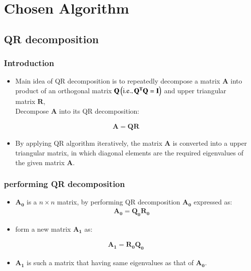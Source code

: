 \documentclass[journal]{IEEEtran}
\begin{document}
\section{Chosen Algorithm}
\subsection{QR decomposition\\}
\subsubsection{Introduction\\}
\begin{itemize}
    \item Main idea of QR decomposition is to repeatedly decompose a matrix $\mathbf{A}$ into product of an orthogonal matrix $\mathbf{Q} \left(\text{i.e}.,\mathbf{Q^{T}Q=I}\right)$ and upper triangular matrix $\mathbf{R}$, \\
    
    Decompose $\mathbf{A}$ into its QR decomposition:
\end{itemize}
\begin{align*}
    \mathbf{A=QR}
\end{align*}
\begin{itemize}
    \item By applying QR algorithm iteratively, the matrix $\mathbf{A}$ is converted into a upper triangular matrix, in which diagonal elements are the required eigenvalues of the given matrix $\mathbf{A}$.\\ 
\end{itemize}

\subsubsection{performing QR decomposition\\}
\begin{itemize}
    \item $\mathbf{A_0}$ is a $n \times n$ matrix, by performing QR decomposition $\mathbf{A_0}$ expressed as:
    \begin{align*}
        \mathbf{A_0 = Q_{0}R_{0}}
    \end{align*}
    \item form a new matrix $\mathbf{A_1}$ as:
    
\end{itemize}
\begin{align*}
    \mathbf{A_1 = R_{0}Q_{0}}
\end{align*}
\begin{itemize}
    \item $\mathbf{A_1}$ is such a matrix that having same eigenvalues as that of $\mathbf{A_{0}}$.
    \\
\end{itemize}
\end{document}
